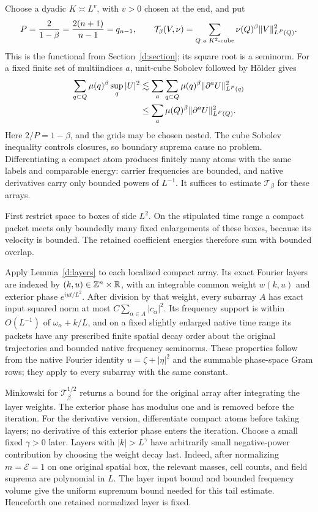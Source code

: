 Choose a dyadic $K\asymp L^v$, with $v>0$ chosen at the end, and put
\[
 P=\frac2{1-\beta}=\frac{2(n+1)}{n-1}=q_{n-1},\qquad
 \mathcal T_\beta(V,\nu)
       =\sum_{Q\text{ a }K^2\text{-cube}}
                      \nu(Q)^\beta\lVert V\rVert_{L^P(Q)}^2.
\]
This is the functional from Section~\ref{d:section}; its square root
is a seminorm.  For a fixed finite set of multiindices $a$, unit-cube
Sobolev followed by H\"older gives
\begin{equation}\label{s:sobolev}
 \begin{split}
 \sum_{q\subset Q}\mu(q)^\beta\sup_q|U|^2
 &\lesssim\sum_a\sum_{q\subset Q}\mu(q)^\beta
                          \lVert \partial^aU\rVert_{L^P(q)}^2\\
 &\le\sum_a\mu(Q)^\beta\lVert \partial^aU\rVert_{L^P(Q)}^2.
 \end{split}
\end{equation}
Here $2/P=1-\beta$, and the grids may be chosen nested.  The cube
Sobolev inequality controls closures, so boundary suprema cause no
problem.  Differentiating a compact atom produces finitely many atoms
with the same labels and comparable energy: carrier frequencies are
bounded, and native derivatives carry only bounded powers of $L^{-1}$.
It suffices to estimate $\mathcal T_\beta$ for these arrays.

First restrict space to boxes of side $L^2$.  On the stipulated time
range a compact packet meets only boundedly many fixed enlargements of
these boxes, because its velocity is bounded.  The retained coefficient
energies therefore sum with bounded overlap.

Apply Lemma~\ref{d:layers} to each localized compact array.  Its exact
Fourier layers are indexed by $(k,u)\in\mathbb Z^n\times\mathbb R$, with an integrable
common weight $w(k,u)$ and exterior phase $e^{iut/L^2}$.  After division
by that weight, every subarray $A$ has exact input squared norm at most
$C\sum_{\alpha\in A}|c_\alpha|^2$.  Its frequency support is within
$O(L^{-1})$ of $\omega_\alpha+k/L$, and on a fixed slightly enlarged
native time range its packets have any prescribed finite spatial decay
order about the original trajectories and bounded native frequency
seminorms.  These properties follow from the native Fourier identity
$u=\zeta+|\eta|^2$ and the summable phase-space Gram rows; they apply
to every subarray with the same constant.

Minkowski for $\mathcal T_\beta^{1/2}$ returns a bound for the original
array after integrating the layer weights.  The exterior phase has
modulus one and is removed before the iteration.  For the derivative
version, differentiate compact atoms before taking layers; no derivative
of this exterior phase enters the iteration.
Choose a small fixed $\gamma>0$ later.  Layers with $|k|>L^\gamma$
have arbitrarily small negative-power contribution by choosing the
weight decay last.  Indeed, after normalizing $m=\mathcal E=1$ on one
original spatial box, the relevant masses, cell counts, and field
suprema are polynomial in $L$.  The layer input bound and bounded
frequency volume give the uniform supremum bound needed for this tail
estimate.  Henceforth one retained normalized layer is fixed.

